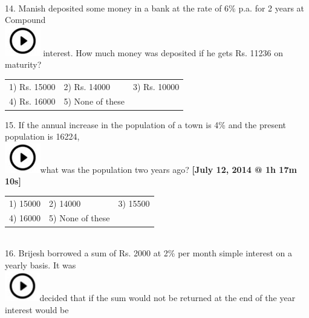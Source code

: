 \documentclass{article}
\begin{document}
	\noindent \\  
	
	14. Manish deposited some money in a bank at the rate of 6\% p.a. for 2 years at Compound  
\noindent \\ \includegraphics*[width=0.61in, height=0.52in]{images/image1} interest. How much money was deposited if he gets Rs. 11236 on maturity?
	
	\noindent \begin{tabular}{p{1.7in} p{1.6in} p{1.6in}} \\ 
 1) Rs. 15000               &  2) Rs. 14000        &  3) Rs. 10000        \\
4) Rs. 16000        & 5) None of these  \\
\end{tabular}
	
\newpage
	
	15. If the annual increase in the population of a town is 4\% and the present population is 16224,  
\noindent \\ \includegraphics*[width=0.61in, height=0.52in]{images/image1}what was the population two years ago?             \textbf{[July 12, 2014 @ 1h 17m 10s]}
	
	\noindent \begin{tabular}{p{1.7in} p{1.6in} p{1.6in}} \\ 
 1) 15000                  &  2) 14000           &  3) 15500           \\
4) 16000           & 5) None of these  \\
\end{tabular}
	
	\noindent  \\ 
	
	16. Brijesh borrowed a sum of Rs. 2000 at 2\% per month simple interest on a yearly basis. It was  
\noindent \\ \includegraphics*[width=0.60in, height=0.52in]{images/image1}decided that if the sum would not be returned at the end of the year interest would be
	
\end{document}
